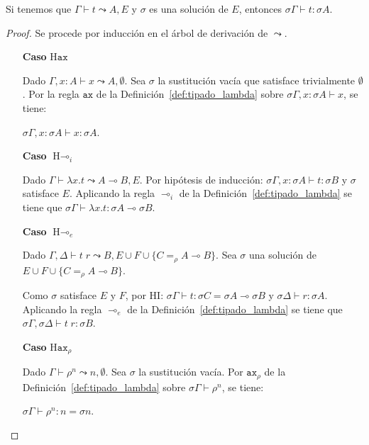 \begin{teorema}\label{teo:hindley_proof}
Si tenemos que $\Gamma \vdash t \leadsto A, E$ y $\sigma$ es una solución de $E$, entonces $\sigma \Gamma \vdash t: \sigma A$.
\end{teorema}
\begin{proof}
Se procede por inducción en el árbol de derivación de $\leadsto$.

\begin{itemize}
    \item[\textbf{Caso}] $\text{H}\mathtt{ax}$

Dado $\Gamma, x: A \vdash x \leadsto A, \emptyset$. Sea $\sigma$ la sustitución vacía que satisface trivialmente $\emptyset$. Por la regla $\mathtt{ax}$ de la Definición~\ref{def:tipado_lambda} sobre $\sigma \Gamma, x: \sigma A \vdash x$, se tiene:

$\sigma \Gamma, x: \sigma A \vdash x : \sigma A$.

    \item[\textbf{Caso}] $\text{H}\multimap_i$

Dado $\Gamma \vdash \lambda x.t \leadsto A \multimap B, E$.
Por hipótesis de inducción: $\sigma \Gamma, x: \sigma A \vdash t: \sigma B$ y $\sigma$ satisface $E$. Aplicando la regla $\multimap_i$ de la Definición~\ref{def:tipado_lambda} se tiene que $\sigma \Gamma \vdash \lambda x .t : \sigma A \multimap \sigma B$.

    \item[\textbf{Caso}] $\text{H}\multimap_e$

Dado $\Gamma, \Delta \vdash t\;r  \leadsto B, E \cup F \cup \{C =_\rho A \multimap B\}$. Sea $\sigma$ una solución de $E \cup F \cup \{C =_\rho A \multimap B\}$.


Como $\sigma$ satisface $E$ y $F$, por HI: $\sigma \Gamma \vdash t  : \sigma C = \sigma A \multimap \sigma B$ y $\sigma \Delta \vdash r : \sigma A$. Aplicando la regla $\multimap_e$ de la Definición~\ref{def:tipado_lambda} se tiene que $\sigma \Gamma, \sigma \Delta \vdash t\;r: \sigma B$.

    \item[\textbf{Caso}] $\text{H}\mathtt{ax}_\rho$

Dado $\Gamma \vdash \rho^n  \leadsto n, \emptyset$. Sea $\sigma$ la sustitución vacía. Por $\mathtt{ax}_\rho$ de la Definición~\ref{def:tipado_lambda} sobre $\sigma \Gamma \vdash \rho^n$, se tiene:

$\sigma \Gamma \vdash \rho^n : n = \sigma n$.


\end{itemize}
\end{proof}
